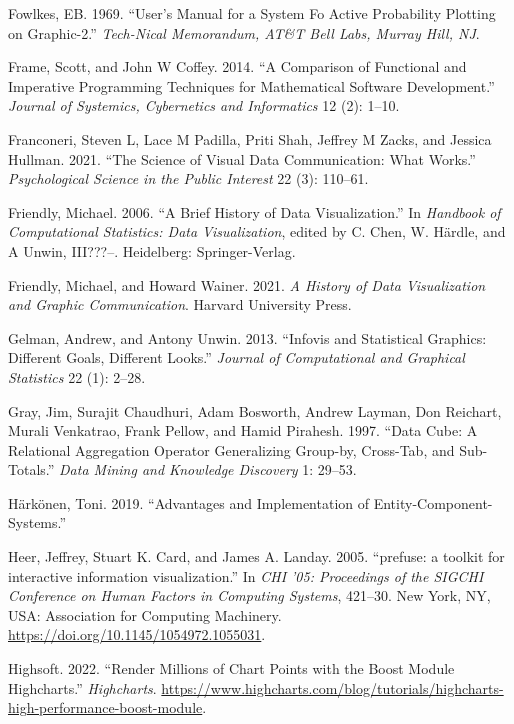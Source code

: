 \documentclass[
]{book}
\newlength{\cslhangindent}
\newenvironment{CSLReferences}[2] %
 {\begin{list}{}{%
  \setlength{\itemindent}{0pt}
  \setlength{\leftmargin}{0pt}
  \setlength{\parsep}{0pt}
  \ifodd #1
   \setlength{\leftmargin}{\cslhangindent}
   \setlength{\itemindent}{-1\cslhangindent}
  \fi
  \setlength{\itemsep}{#2\baselineskip}}}
 {\end{list}}
\theoremstyle{definition}
\theoremstyle{definition}
\theoremstyle{definition}
\theoremstyle{definition}
\theoremstyle{remark}
\begin{document}
\begin{CSLReferences}{1}{0}
Fowlkes, EB. 1969. {``User's Manual for a System Fo Active Probability Plotting on Graphic-2.''} \emph{Tech-Nical Memorandum, AT\&T Bell Labs, Murray Hill, NJ}.

Frame, Scott, and John W Coffey. 2014. {``A Comparison of Functional and Imperative Programming Techniques for Mathematical Software Development.''} \emph{Journal of Systemics, Cybernetics and Informatics} 12 (2): 1--10.

Franconeri, Steven L, Lace M Padilla, Priti Shah, Jeffrey M Zacks, and Jessica Hullman. 2021. {``The Science of Visual Data Communication: What Works.''} \emph{Psychological Science in the Public Interest} 22 (3): 110--61.

Friendly, Michael. 2006. {``A Brief History of Data Visualization.''} In \emph{Handbook of Computational Statistics: Data Visualization}, edited by C. Chen, W. Härdle, and A Unwin, III???--. Heidelberg: Springer-Verlag.

Friendly, Michael, and Howard Wainer. 2021. \emph{A History of Data Visualization and Graphic Communication}. Harvard University Press.

Gelman, Andrew, and Antony Unwin. 2013. {``Infovis and Statistical Graphics: Different Goals, Different Looks.''} \emph{Journal of Computational and Graphical Statistics} 22 (1): 2--28.

Gray, Jim, Surajit Chaudhuri, Adam Bosworth, Andrew Layman, Don Reichart, Murali Venkatrao, Frank Pellow, and Hamid Pirahesh. 1997. {``Data Cube: A Relational Aggregation Operator Generalizing Group-by, Cross-Tab, and Sub-Totals.''} \emph{Data Mining and Knowledge Discovery} 1: 29--53.

Härkönen, Toni. 2019. {``Advantages and Implementation of Entity-Component-Systems.''}

Heer, Jeffrey, Stuart K. Card, and James A. Landay. 2005. {``{prefuse: a toolkit for interactive information visualization}.''} In \emph{{CHI '05: Proceedings of the SIGCHI Conference on Human Factors in Computing Systems}}, 421--30. New York, NY, USA: Association for Computing Machinery. \url{https://doi.org/10.1145/1054972.1055031}.

Highsoft. 2022. {``Render Millions of Chart Points with the Boost Module {\textendash} Highcharts.''} \emph{Highcharts}. \url{https://www.highcharts.com/blog/tutorials/highcharts-high-performance-boost-module}.


\end{CSLReferences}
\end{document}
